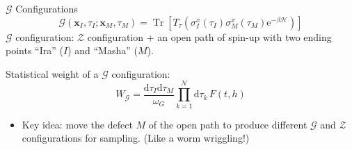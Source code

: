 \documentclass[aspectratio=43]{beamer}
\DeclareMathOperator{\Tr}{Tr}
\begin{document}
\begin{frame}{$\mathcal{G}$ Configurations}
  \[
    \mathcal{G}(\bm{x}_I, \tau_I; \bm{x}_M, \tau_M) = \Tr\left[ T_\tau\left( \sigma_I^x(\tau_I)\sigma_M^x(\tau_M)\mathrm{e}^{-\beta\mathcal{H}} \right) \right]
  \]
  $\mathcal{G}$ configuration: $\mathcal{Z}$ configuration + an open path of spin-up with two ending points ``Ira'' ($I$) and ``Masha'' ($M$).

  Statistical weight of a $\mathcal{G}$ configuration:
  \[
    W_\mathcal{G} = \frac{\mathrm{d}\tau_I\mathrm{d}\tau_M}{\omega_G} \prod_{k=1}^{\mathcal{N}}\mathrm{d}\tau_k\,F(t, h)
  \]
  \begin{itemize}
    \item Key idea: move the defect $M$ of the open path to produce different $\mathcal{G}$ and $\mathcal{Z}$ configurations for sampling. (Like a worm wriggling!)
  \end{itemize}
\end{frame}
\end{document}

